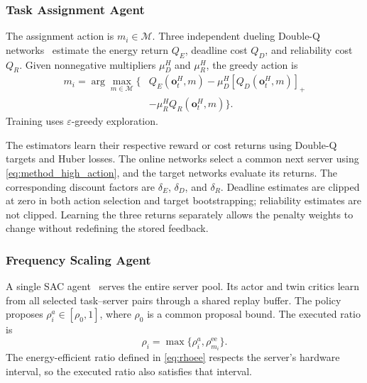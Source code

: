 \documentclass[journal]{IEEEtran}
\begin{document}
\subsubsection{Task Assignment Agent}
\label{subsec:high}

The assignment action is $m_i\in\mathcal M$. Three independent dueling Double-Q networks~\cite{vanhasselt2016,wang2016dueling} estimate the energy return $Q_E$, deadline cost $Q_D$, and reliability cost $Q_R$. Given nonnegative multipliers $\mu_D^H$ and $\mu_R^H$, the greedy action is
\begin{equation}
\begin{aligned}
    m_i=\arg\max_{m\in\mathcal M}\big\{
    &Q_E(\boldsymbol o_t^H,m)
    -\mu_D^H[Q_D(\boldsymbol o_t^H,m)]_+\\
    &-\mu_R^H Q_R(\boldsymbol o_t^H,m)
    \big\}.
\end{aligned}
    \label{eq:method_high_action}
\end{equation}
Training uses $\varepsilon$-greedy exploration.

The estimators learn their respective reward or cost returns using Double-Q targets and Huber losses. The online networks select a common next server using \eqref{eq:method_high_action}, and the target networks evaluate its returns. The corresponding discount factors are $\delta_E$, $\delta_D$, and $\delta_R$. Deadline estimates are clipped at zero in both action selection and target bootstrapping; reliability estimates are not clipped. Learning the three returns separately allows the penalty weights to change without redefining the stored feedback.

\subsubsection{Frequency Scaling Agent}
\label{subsec:low}

A single SAC agent~\cite{haarnoja2018} serves the entire server pool. Its actor and twin critics learn from all selected task--server pairs through a shared replay buffer. The policy proposes $\rho_i^a\in[\rho_0,1]$, where $\rho_0$ is a common proposal bound. The executed ratio is
\begin{equation}
    \rho_i=\max\{\rho_i^a,\rho_{m_i}^{\mathrm{ee}}\}.
    \label{eq:method_frequency_floor}
\end{equation}
The energy-efficient ratio defined in \eqref{eq:rhoee} respects the server's hardware interval, so the executed ratio also satisfies that interval.
\end{document}
